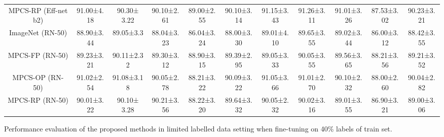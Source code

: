\documentclass[conference]{IEEEtran}
\begin{document}
\begin{table*}[h]
\begin{adjustbox}{max width=\textwidth}
\begin{tabular}{c|cccc|c|cccc|c}
MPCS-RP (Eff-net b2)     & \multicolumn{1}{c|}{91.00±4.18} & \multicolumn{1}{c|}{{\color[HTML]{1E1E1E} 90.30± 3.22}} & \multicolumn{1}{c|}{{\color[HTML]{1E1E1E} 90.10±2.61}} & {\color[HTML]{1E1E1E} 89.00±2.55} & 90.10±3.14                        & \multicolumn{1}{c|}{91.15±3.43} & \multicolumn{1}{c|}{91.26±3.11} & \multicolumn{1}{c|}{91.01±3.26} & 87.53±3.02 & 90.23±3.21             \\
ImageNet (RN-50)         & \multicolumn{1}{c|}{88.90±3.44} & \multicolumn{1}{c|}{89.05±3.3}                          & \multicolumn{1}{c|}{88.04±3.23}                        & 86.04±3.24                        & 88.00±3.30                        & \multicolumn{1}{c|}{89.01±4.10} & \multicolumn{1}{c|}{89.65±3.55} & \multicolumn{1}{c|}{89.02±3.44} & 86.00±3.12 & 88.42±3.55             \\
MPCS-FP (RN-50)          & \multicolumn{1}{c|}{89.23±3.21} & \multicolumn{1}{c|}{90.11±2.32}                         & \multicolumn{1}{c|}{89.30±3.12}                        & 88.90±3.15                        & 89.39±2.95                        & \multicolumn{1}{c|}{89.05±3.33} & \multicolumn{1}{c|}{90.05±3.55} & \multicolumn{1}{c|}{89.56±3.65} & 88.21±3.56 & 89.21±3.52             \\
MPCS-OP (RN-50)          & \multicolumn{1}{c|}{91.02±2.54} & \multicolumn{1}{c|}{91.08±3.18}                         & \multicolumn{1}{c|}{{\color[HTML]{1E1E1E} 90.05±2.78}} & {\color[HTML]{1E1E1E} 88.21±3.22} & {\color[HTML]{1E1E1E} 90.09±3.22} & \multicolumn{1}{c|}{91.05±3.66} & \multicolumn{1}{c|}{91.01±2.70} & \multicolumn{1}{c|}{90.10±2.32} & 88.00±2.60 & 90.04±2.82             \\
MPCS-RP (RN-50)          & \multicolumn{1}{c|}{90.01±3.22} & \multicolumn{1}{c|}{{\color[HTML]{1E1E1E} 90.10± 3.28}} & \multicolumn{1}{c|}{{\color[HTML]{1E1E1E} 90.21±3.56}} & {\color[HTML]{1E1E1E} 88.22±3.20} & 89.64±3.32                        & \multicolumn{1}{c|}{90.05±2.32} & \multicolumn{1}{c|}{90.02±3.16} & \multicolumn{1}{c|}{89.01±3.55} & 86.90±3.21 & 89.00±3.06             \\ \hline
\end{tabular}
\end{adjustbox}
\end{table*} \begin{table*}[h!t]
\centering
\caption{Performance evaluation of the proposed methods in limited labelled data setting when fine-tuning on 40\% labels of train set.}
\label{tab:breakhis_40_label_mpcs}
\begin{adjustbox}{max width=\textwidth}

\end{adjustbox}
\end{table*}
\end{document}
